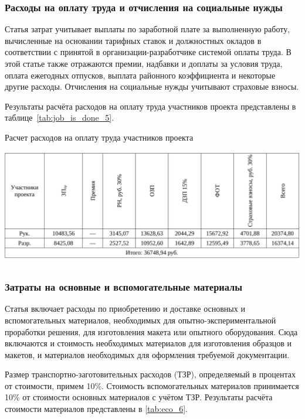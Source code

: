 \subsubsection{Расходы на оплату труда и отчисления на социальные нужды}

Статья затрат учитывает выплаты по заработной плате за выполненную работу, 
вычисленные на основании тарифных ставок и должностных окладов в соответствии с принятой в 
организации-разработчике системой оплаты труда. В этой статье также отражаются премии, надбавки и доплаты за 
условия труда, оплата ежегодных отпусков, выплата районного коэффициента и некоторые другие расходы. 
Отчисления на социальные нужды учитывают страховые взносы.

Результаты расчёта расходов на оплату труда участников проекта представлены в таблице~\ref{tab:job_is_done_5}.

\begin{table}[!ht]
\caption{Расчет расходов на оплату труда участников проекта}
\centering
\includegraphics[page=1, width=1\linewidth]{tables/economics/schedule_5.pdf}
\label{tab:job_is_done_5}
\end{table}


\subsubsection{Затраты на основные и вспомогательные материалы}

Статья включает расходы по приобретению и доставке основных и вспомогательных материалов, необходимых для опытно-экспериментальной проработки 
решения, для изготовления макета или опытного оборудования. Сюда включаются и стоимость необходимых материалов для изготовления образцов и 
макетов, и материалов необходимых для оформления требуемой документации.

Размер транспортно-заготовительных расходов (ТЗР), определяемый в процентах от стоимости, примем 10\%. 
Стоимость вспомогательных материалов принимается 10\% от стоимости основных материалов с учётом ТЗР. 
Результаты расчёта стоимости материалов представлены в \ref{tab:eco_6}.

